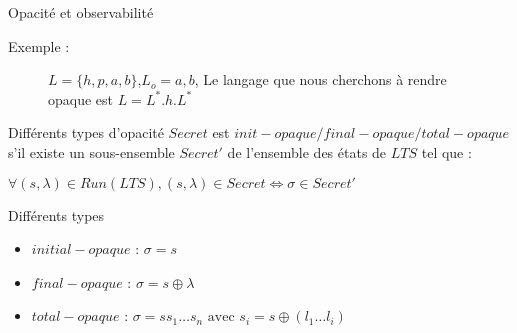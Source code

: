 \documentclass[11pt]{beamer}
\begin{document}
\begin{section}{Opacit\'e et observabilit\'e}
  \begin{frame}{Exemple :}
    \begin{figure}[H]
                \centering
                \caption{$L = \{h,p,a,b\}$,$L_o = {a,b}$, Le langage que nous cherchons \`a rendre opaque est $L = L^*.h.L^*$}
		\end{figure}		
   
  \end{frame}

  
  \begin{frame}{Diff\'erents types d'opacit\'e}
    $Secret$ est $init-opaque/final-opaque/total-opaque$ s'il existe un sous-ensemble  $Secret'$ de l'ensemble des \'etats de $LTS$ tel que :
    
    $\forall (s,\lambda) \in Run(LTS), (s, \lambda) \in Secret \Leftrightarrow \sigma \in Secret'$
    
    \begin{block}{Diff\'erents types}
      \begin{itemize}
	\item $initial-opaque$ : $\sigma = s$
	\item $final-opaque$ : $\sigma = s\oplus \lambda$
	\item $total-opaque$ : $\sigma = s s_1 \dots s_n \mbox{ avec } s_i = s\oplus(l_1\dots l_i)$
      \end{itemize} 

    \end{block}


  \end{frame}

 
\end{section}
\end{document}
